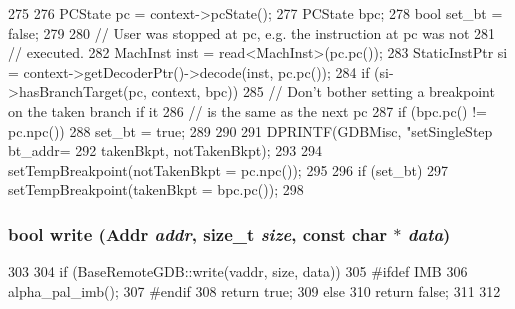 \begin{DoxyCode}
275 {
276     PCState pc = context->pcState();
277     PCState bpc;
278     bool set_bt = false;
279 
280     // User was stopped at pc, e.g. the instruction at pc was not
281     // executed.
282     MachInst inst = read<MachInst>(pc.pc());
283     StaticInstPtr si = context->getDecoderPtr()->decode(inst, pc.pc());
284     if (si->hasBranchTarget(pc, context, bpc)) {
285         // Don't bother setting a breakpoint on the taken branch if it
286         // is the same as the next pc
287         if (bpc.pc() != pc.npc())
288             set_bt = true;
289     }
290 
291     DPRINTF(GDBMisc, "setSingleStep bt_addr=%
292             takenBkpt, notTakenBkpt);
293 
294     setTempBreakpoint(notTakenBkpt = pc.npc());
295 
296     if (set_bt)
297         setTempBreakpoint(takenBkpt = bpc.pc());
298 }
\end{DoxyCode}
\hypertarget{classAlphaISA_1_1RemoteGDB_afbada55bb9d0e9c8c26bb48cb5890111}{
\subsubsection[{write}]{\setlength{\rightskip}{0pt plus 5cm}bool write ({\bf Addr} {\em addr}, \/  size\_\-t {\em size}, \/  const char $\ast$ {\em data})}}
\label{classAlphaISA_1_1RemoteGDB_afbada55bb9d0e9c8c26bb48cb5890111}



\begin{DoxyCode}
303 {
304     if (BaseRemoteGDB::write(vaddr, size, data)) {
305 #ifdef IMB
306         alpha_pal_imb();
307 #endif
308         return true;
309     } else {
310         return false;
311     }
312 }
\end{DoxyCode}


